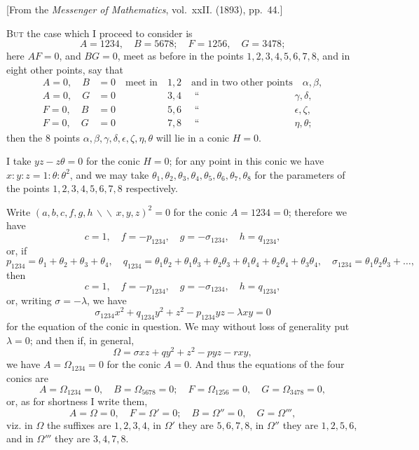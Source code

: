 \documentclass[11pt,a4paper]{book}
\begin{document}
{{{[From the \textit{Messenger of Mathematics}, vol.~xxII. (1893), pp.~44.]

\textsc{But} the case which I proceed to consider is
\[
A = 1234, \quad B = 5678; \quad F = 1256, \quad G = 3478;
\]
here $AF = 0$, and $BG = 0$, meet as before in the points $1, 2, 3, 4, 5, 6, 7, 8$, and in
eight other points, say that
\begin{align*}
A = 0, \quad B &= 0 \quad \text{meet in} \quad 1, 2 \quad \text{and in two other points} \quad \alpha, \beta, \\
A = 0, \quad G &= 0 \quad\phantom{\text{meet in}} \quad 3, 4 \quad\,\, \text{``}\,\,\, \quad\phantom{\text{two other points}} \quad \gamma, \delta, \\
F = 0, \quad B &= 0 \quad\phantom{\text{meet in}} \quad 5, 6 \quad\,\, \text{``}\,\,\, \quad\phantom{\text{two other points}} \quad \epsilon, \zeta, \\
F = 0, \quad G &= 0 \quad\phantom{\text{meet in}} \quad 7, 8 \quad\,\, \text{``}\,\,\, \quad\phantom{\text{two other points}} \quad \eta, \theta;
\end{align*}
then the 8 points $\alpha, \beta, \gamma, \delta, \epsilon, \zeta, \eta, \theta$ will lie in a conic $H = 0$.

I take $yz - z\theta = 0$ for the conic $H = 0$; for any point in this conic we have
$x : y : z = 1 : \theta : \theta^2$, and we may take $\theta_1, \theta_2, \theta_3, \theta_4, \theta_5, \theta_6, \theta_7, \theta_8$
for the parameters of the points $1, 2, 3, 4, 5, 6, 7, 8$ respectively.

Write $(a, b, c, f, g, h \,\backslash\!\!\backslash\, x, y, z)^2 = 0$ for the conic $A = 1234 = 0$;
therefore we have
\[
c = 1, \quad f = -p_{1234}, \quad g = -\sigma_{1234}, \quad h = q_{1234},
\]
or, if
\[
p_{1234} = \theta_1 + \theta_2 + \theta_3 + \theta_4, \quad
q_{1234} = \theta_1\theta_2 + \theta_1\theta_3 + \theta_2\theta_3 + \theta_1\theta_4 + \theta_2\theta_4 + \theta_3\theta_4, \quad
\sigma_{1234} = \theta_1\theta_2\theta_3 + \ldots,
\]
then
\[
c = 1, \quad f = -p_{1234}, \quad g = -\sigma_{1234}, \quad h = q_{1234},
\]
or, writing $\sigma = -\lambda$, we have
\[
\sigma_{1234} x^2 + q_{1234} y^2 + z^2 - p_{1234} yz - \lambda xy = 0
\]
for the equation of the conic in question. We may without loss of generality put
$\lambda = 0$; and then if, in general,
\[
\Omega = \sigma xz + q y^2 + z^2 - py z - r xy,
\]
we have $A = \Omega_{1234} = 0$ for the conic $A = 0$. And thus the equations of the four
conics are
\[
A = \Omega_{1234} = 0, \quad B = \Omega_{5678} = 0; \quad
F = \Omega_{1256} = 0, \quad G = \Omega_{3478} = 0,
\]
or, as for shortness I write them,
\[
A = \Omega = 0, \quad F = \Omega' = 0; \quad B = \Omega'' = 0, \quad G = \Omega''',
\]
viz. in $\Omega$ the suffixes are $1, 2, 3, 4$, in $\Omega'$ they are $5, 6, 7, 8$, in $\Omega''$ they are $1, 2, 5, 6$,
and in $\Omega'''$ they are $3, 4, 7, 8$.

}}}
\end{document}
